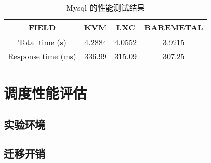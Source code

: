 \begin{table}[h]
    \centering
    \caption{Mysql 的性能测试结果}
    \begin{tabular}{||c c c c||}
        \hline
        FIELD & KVM & LXC & BAREMETAL \\
        \hline
        \hline
        Total time (s) & 4.2884 & 4.0552 & 3.9215 \\
        \hline
        Response time (ms) & 336.99 & 315.09 & 307.25 \\
        \hline
    \end{tabular}
    \label{tab:mysql-perf}
\end{table}

\section{调度性能评估}

\subsection{实验环境}

\subsection{迁移开销}

